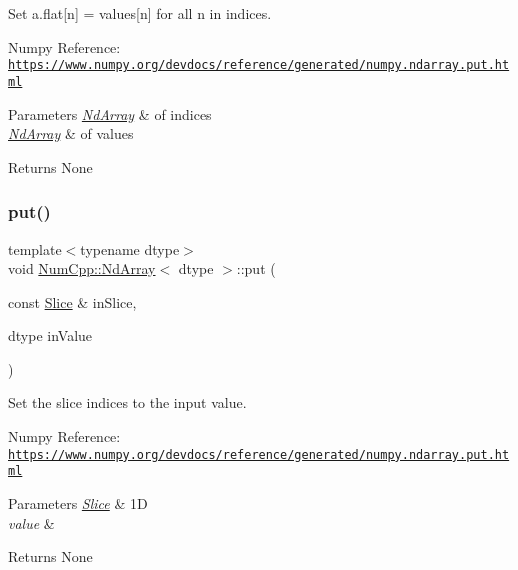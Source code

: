 Set a.\+flat\mbox{[}n\mbox{]} = values\mbox{[}n\mbox{]} for all n in indices.

Numpy Reference\+: \href{https://www.numpy.org/devdocs/reference/generated/numpy.ndarray.put.html}{\tt https\+://www.\+numpy.\+org/devdocs/reference/generated/numpy.\+ndarray.\+put.\+html}


\begin{DoxyParams}{Parameters}
{\em \mbox{\hyperlink{class_num_cpp_1_1_nd_array}{Nd\+Array}}} & of indices \\
\hline
{\em \mbox{\hyperlink{class_num_cpp_1_1_nd_array}{Nd\+Array}}} & of values \\
\hline
\end{DoxyParams}
\begin{DoxyReturn}{Returns}
None 
\end{DoxyReturn}
\mbox{\label{class_num_cpp_1_1_nd_array_aa0b9bc04c12b9ab2fa1e031aa1f2f42d}} 
\subsubsection{\texorpdfstring{put()}{put()}\hspace{0.1cm}{\footnotesize\ttfamily [5/12]}}
{\footnotesize\ttfamily template$<$typename dtype$>$ \\
void \mbox{\hyperlink{class_num_cpp_1_1_nd_array}{Num\+Cpp\+::\+Nd\+Array}}$<$ dtype $>$\+::put (\begin{DoxyParamCaption}\item[{const \mbox{\hyperlink{class_num_cpp_1_1_slice}{Slice}} \&}]{in\+Slice,  }\item[{dtype}]{in\+Value }\end{DoxyParamCaption})\hspace{0.3cm}{\ttfamily [inline]}}

Set the slice indices to the input value.

Numpy Reference\+: \href{https://www.numpy.org/devdocs/reference/generated/numpy.ndarray.put.html}{\tt https\+://www.\+numpy.\+org/devdocs/reference/generated/numpy.\+ndarray.\+put.\+html}


\begin{DoxyParams}{Parameters}
{\em \mbox{\hyperlink{class_num_cpp_1_1_slice}{Slice}}} & 1D \\
\hline
{\em value} & \\
\hline
\end{DoxyParams}
\begin{DoxyReturn}{Returns}
None 
\end{DoxyReturn}
\mbox{\label{class_num_cpp_1_1_nd_array_a884168d3130615e8722df602cd96beb8}} 
